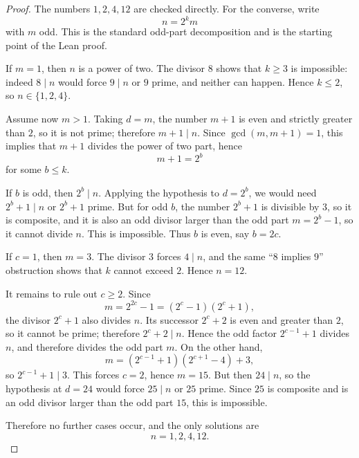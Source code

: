 \begin{proof}
The numbers \(1,2,4,12\) are checked directly. For the converse, write
\[
  n = 2^k m
\]
with \(m\) odd. This is the standard odd-part decomposition and is the starting
point of the Lean proof.

If \(m=1\), then \(n\) is a power of two. The divisor \(8\) shows that
\(k\ge 3\) is impossible: indeed \(8\mid n\) would force \(9\mid n\) or \(9\)
prime, and neither can happen. Hence \(k\le 2\), so \(n\in\{1,2,4\}\).

Assume now \(m>1\). Taking \(d=m\), the number \(m+1\) is even and strictly
greater than \(2\), so it is not prime; therefore \(m+1\mid n\). Since
\(\gcd(m,m+1)=1\), this implies that \(m+1\) divides the power of two part,
hence
\[
  m+1 = 2^b
\]
for some \(b\le k\).

If \(b\) is odd, then \(2^b\mid n\). Applying the hypothesis to \(d=2^b\), we
would need \(2^b+1\mid n\) or \(2^b+1\) prime. But for odd \(b\), the number
\(2^b+1\) is divisible by \(3\), so it is composite, and it is also an odd
divisor larger than the odd part \(m=2^b-1\), so it cannot divide \(n\). This
is impossible. Thus \(b\) is even, say \(b=2c\).

If \(c=1\), then \(m=3\). The divisor \(3\) forces \(4\mid n\), and the same
``\(8\) implies \(9\)'' obstruction shows that \(k\) cannot exceed \(2\). Hence
\(n=12\).

It remains to rule out \(c\ge 2\). Since
\[
  m = 2^{2c}-1 = (2^c-1)(2^c+1),
\]
the divisor \(2^c+1\) also divides \(n\). Its successor \(2^c+2\) is even and
greater than \(2\), so it cannot be prime; therefore \(2^c+2\mid n\). Hence
the odd factor \(2^{c-1}+1\) divides \(n\), and therefore divides the odd part
\(m\). On the other hand,
\[
  m = (2^{c-1}+1)(2^{c+1}-4)+3,
\]
so \(2^{c-1}+1\mid 3\). This forces \(c=2\), hence \(m=15\). But then
\(24\mid n\), so the hypothesis at \(d=24\) would force \(25\mid n\) or \(25\)
prime. Since \(25\) is composite and is an odd divisor larger than the odd part
\(15\), this is impossible.

Therefore no further cases occur, and the only solutions are
\[
  n=1,2,4,12.
\]
\end{proof}
